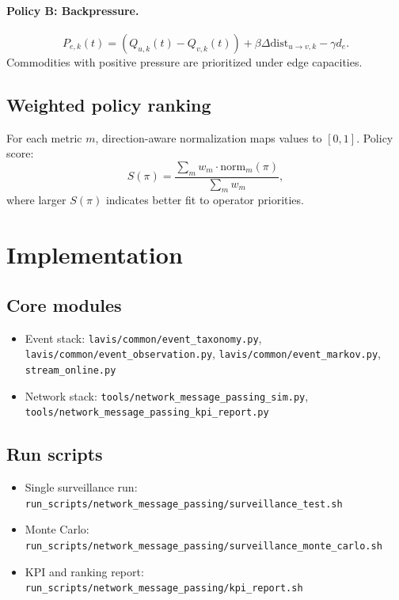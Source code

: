 \documentclass[11pt]{article}
\begin{document}
\paragraph{Policy B: Backpressure.}
\begin{equation}
P_{e,k}(t)=\left(Q_{u,k}(t)-Q_{v,k}(t)\right)
+\beta \Delta \mathrm{dist}_{u\rightarrow v,k}
-\gamma d_e.
\end{equation}
Commodities with positive pressure are prioritized under edge capacities.

\subsection{Weighted policy ranking}
For each metric $m$, direction-aware normalization maps values to $[0,1]$. Policy score:
\begin{equation}
S(\pi)=\frac{\sum_m w_m \cdot \mathrm{norm}_m(\pi)}{\sum_m w_m},
\end{equation}
where larger $S(\pi)$ indicates better fit to operator priorities.

\section{Implementation}
\subsection{Core modules}
\begin{itemize}[leftmargin=1.5em]
  \item Event stack: \texttt{lavis/common/event\_taxonomy.py}, \texttt{lavis/common/event\_observation.py}, \texttt{lavis/common/event\_markov.py}, \texttt{stream\_online.py}
  \item Network stack: \texttt{tools/network\_message\_passing\_sim.py}, \texttt{tools/network\_message\_passing\_kpi\_report.py}
\end{itemize}

\subsection{Run scripts}
\begin{itemize}[leftmargin=1.5em]
  \item Single surveillance run: \texttt{run\_scripts/network\_message\_passing/surveillance\_test.sh}
  \item Monte Carlo: \texttt{run\_scripts/network\_message\_passing/surveillance\_monte\_carlo.sh}
  \item KPI and ranking report: \texttt{run\_scripts/network\_message\_passing/kpi\_report.sh}
\end{itemize}
\end{document}
